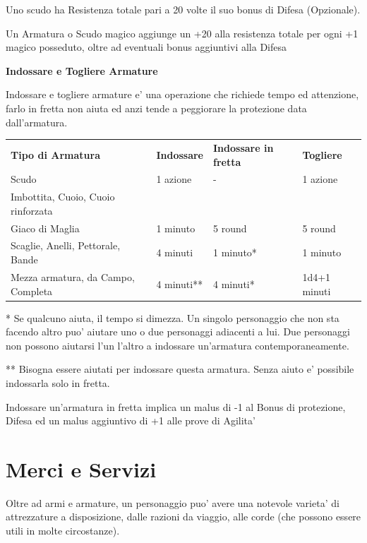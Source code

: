 \documentclass[a4paper,11pt,twoside,openany]{book}
\begin{document}
{Uno scudo ha Resistenza totale pari a 20 volte il suo bonus di Difesa (Opzionale).

\bigskip

Un Armatura o Scudo magico aggiunge un +20 alla resistenza totale
per ogni +1 magico posseduto, oltre ad eventuali bonus aggiuntivi
alla Difesa 

\bigskip
\textbf{Indossare e Togliere Armature}
\bigskip

Indossare e togliere armature e' una operazione che richiede tempo ed attenzione, farlo in fretta non aiuta ed anzi tende a peggiorare la protezione data dall'armatura.

\bigskip

\begin{tabular}{llll}
\toprule
\textbf{Tipo di Armatura} & \textbf{Indossare} & \textbf{Indossare in fretta} & \textbf{Togliere}\tabularnewline
Scudo & 1 azione & - & 1 azione\tabularnewline
Imbottita, Cuoio, Cuoio rinforzata\\
Giaco di Maglia & 1 minuto & 5 round & 5 round\tabularnewline
Scaglie, Anelli, Pettorale, Bande & 4 minuti & 1 minuto{*} & 1 minuto\tabularnewline
Mezza armatura, da Campo, Completa & 4 minuti{*}{*} & 4 minuti{*} & 1d4+1 minuti\tabularnewline

\end{tabular}

\bigskip

{*} Se qualcuno aiuta, il tempo si dimezza. Un singolo personaggio che non sta facendo altro puo' aiutare uno o due personaggi adiacenti a lui. Due personaggi non possono aiutarsi l'un l'altro a indossare un'armatura contemporaneamente.

{*}{*} Bisogna essere aiutati per indossare questa armatura. Senza aiuto e' possibile indossarla solo in fretta.

Indossare un'armatura in fretta implica un malus di -1 al Bonus di protezione, Difesa ed un malus aggiuntivo di +1 alle prove di Agilita'

\pagebreak

\section{Merci e Servizi}

\label{merci-e-servizi}

Oltre ad armi e armature, un personaggio puo' avere una notevole varieta' di attrezzature a disposizione, dalle razioni da viaggio, alle corde (che possono essere utili in molte circostanze). 


}
\end{document}
